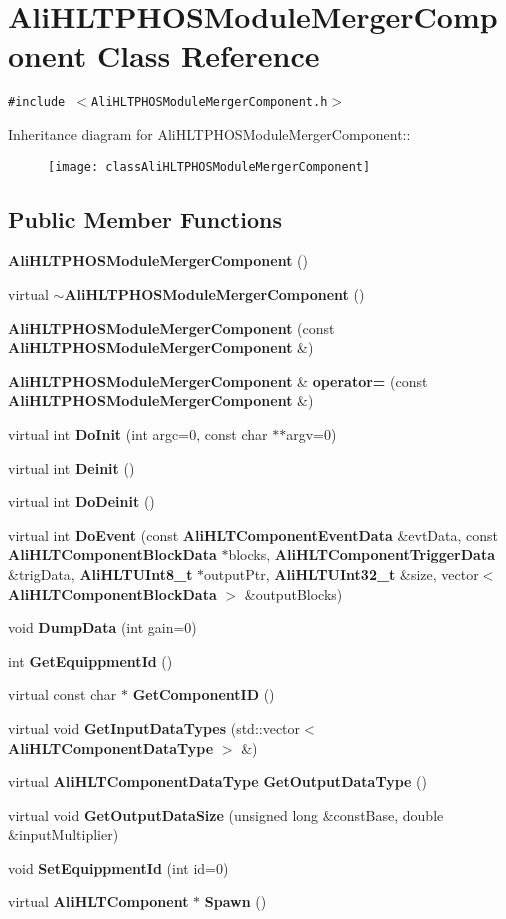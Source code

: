 \section{Ali\-HLTPHOSModule\-Merger\-Component Class Reference}
\label{classAliHLTPHOSModuleMergerComponent}
{\tt \#include $<$Ali\-HLTPHOSModule\-Merger\-Component.h$>$}

Inheritance diagram for Ali\-HLTPHOSModule\-Merger\-Component::\begin{figure}[H]
\begin{center}
\leavevmode
\texttt{[image: classAliHLTPHOSModuleMergerComponent]}
\end{center}
\end{figure}
\subsection*{Public Member Functions}
\begin{CompactItemize}
\item 
{\bf Ali\-HLTPHOSModule\-Merger\-Component} ()
\item 
virtual {\bf $\sim$Ali\-HLTPHOSModule\-Merger\-Component} ()
\item 
{\bf Ali\-HLTPHOSModule\-Merger\-Component} (const {\bf Ali\-HLTPHOSModule\-Merger\-Component} \&)
\item 
{\bf Ali\-HLTPHOSModule\-Merger\-Component} \& {\bf operator=} (const {\bf Ali\-HLTPHOSModule\-Merger\-Component} \&)
\item 
virtual int {\bf Do\-Init} (int argc=0, const char $\ast$$\ast$argv=0)
\item 
virtual int {\bf Deinit} ()
\item 
virtual int {\bf Do\-Deinit} ()
\item 
virtual int {\bf Do\-Event} (const {\bf Ali\-HLTComponent\-Event\-Data} \&evt\-Data, const {\bf Ali\-HLTComponent\-Block\-Data} $\ast$blocks, {\bf Ali\-HLTComponent\-Trigger\-Data} \&trig\-Data, {\bf Ali\-HLTUInt8\_\-t} $\ast$output\-Ptr, {\bf Ali\-HLTUInt32\_\-t} \&size, vector$<$ {\bf Ali\-HLTComponent\-Block\-Data} $>$ \&output\-Blocks)
\item 
void {\bf Dump\-Data} (int gain=0)
\item 
int {\bf Get\-Equippment\-Id} ()
\item 
virtual const char $\ast$ {\bf Get\-Component\-ID} ()
\item 
virtual void {\bf Get\-Input\-Data\-Types} (std::vector$<$ {\bf Ali\-HLTComponent\-Data\-Type} $>$ \&)
\item 
virtual {\bf Ali\-HLTComponent\-Data\-Type} {\bf Get\-Output\-Data\-Type} ()
\item 
virtual void {\bf Get\-Output\-Data\-Size} (unsigned long \&const\-Base, double \&input\-Multiplier)
\item 
void {\bf Set\-Equippment\-Id} (int id=0)
\item 
virtual {\bf Ali\-HLTComponent} $\ast$ {\bf Spawn} ()
\end{CompactItemize}

